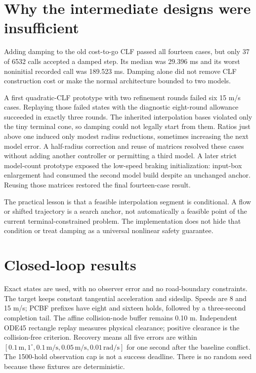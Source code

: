 \documentclass[10pt]{article}
\begin{document}
\section{Why the intermediate designs were insufficient}
Adding damping to the old cost-to-go CLF passed all fourteen cases, but only 37
of 6532 calls accepted a damped step. Its median was 29.396 ms and its worst
noninitial recorded call was 189.523 ms. Damping alone did not remove CLF
construction cost or make the normal architecture bounded to two models.

A first quadratic-CLF prototype with two refinement rounds failed six 15 m/s
cases. Replaying those failed states with the diagnostic eight-round allowance
succeeded in exactly three rounds. The inherited interpolation bases violated
only the tiny terminal cone, so damping could not legally start from them.
Ratios just above one induced only modest radius reductions, sometimes increasing
the next model error. A half-radius correction and reuse of matrices resolved
these cases without adding another controller or permitting a third model.
A later strict model-count prototype exposed the low-speed braking initialization:
input-box enlargement had consumed the second model build despite an unchanged
anchor. Reusing those matrices restored the final fourteen-case result.

The practical lesson is that a feasible interpolation segment is conditional.
A flow or shifted trajectory is a search anchor, not automatically a feasible
point of the current terminal-constrained problem. The implementation does not
hide that condition or treat damping as a universal nonlinear safety guarantee.

\section{Closed-loop results}
Exact states are used, with no observer error and no road-boundary constraints.
The target keeps constant tangential acceleration and sideslip. Speeds are 8 and
15 m/s; PCBF prefixes have eight and sixteen holds, followed by a three-second
completion tail. The affine collision-node buffer remains 0.10 m. Independent
ODE45 rectangle replay measures physical clearance; positive clearance is the
collision-free criterion. Recovery means all five errors are within
$[0.1\,\mathrm m,1^\circ,0.1\,\mathrm{m/s},0.05\,\mathrm{m/s},0.01\,\mathrm{rad/s}]$
for one second after the baseline conflict. The 1500-hold observation cap is
not a success deadline. There is no random seed because these fixtures are deterministic.
\end{document}
